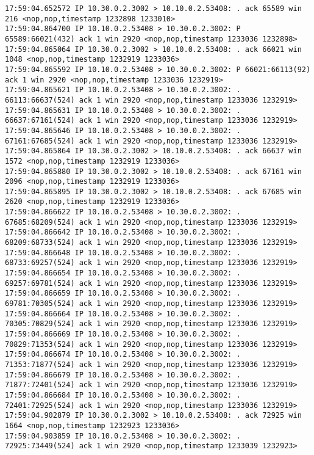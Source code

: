 \documentclass[a4paper,12pt]{article}
\begin{document}
\begin{Verbatim}
17:59:04.652572 IP 10.30.0.2.3002 > 10.10.0.2.53408: . ack 65589 win 216 <nop,nop,timestamp 1232898 1233010>
17:59:04.864700 IP 10.10.0.2.53408 > 10.30.0.2.3002: P 65589:66021(432) ack 1 win 2920 <nop,nop,timestamp 1233036 1232898>
17:59:04.865064 IP 10.30.0.2.3002 > 10.10.0.2.53408: . ack 66021 win 1048 <nop,nop,timestamp 1232919 1233036>
17:59:04.865592 IP 10.10.0.2.53408 > 10.30.0.2.3002: P 66021:66113(92) ack 1 win 2920 <nop,nop,timestamp 1233036 1232919>
17:59:04.865621 IP 10.10.0.2.53408 > 10.30.0.2.3002: . 66113:66637(524) ack 1 win 2920 <nop,nop,timestamp 1233036 1232919>
17:59:04.865631 IP 10.10.0.2.53408 > 10.30.0.2.3002: . 66637:67161(524) ack 1 win 2920 <nop,nop,timestamp 1233036 1232919>
17:59:04.865646 IP 10.10.0.2.53408 > 10.30.0.2.3002: . 67161:67685(524) ack 1 win 2920 <nop,nop,timestamp 1233036 1232919>
17:59:04.865864 IP 10.30.0.2.3002 > 10.10.0.2.53408: . ack 66637 win 1572 <nop,nop,timestamp 1232919 1233036>
17:59:04.865880 IP 10.30.0.2.3002 > 10.10.0.2.53408: . ack 67161 win 2096 <nop,nop,timestamp 1232919 1233036>
17:59:04.865895 IP 10.30.0.2.3002 > 10.10.0.2.53408: . ack 67685 win 2620 <nop,nop,timestamp 1232919 1233036>
17:59:04.866622 IP 10.10.0.2.53408 > 10.30.0.2.3002: . 67685:68209(524) ack 1 win 2920 <nop,nop,timestamp 1233036 1232919>
17:59:04.866642 IP 10.10.0.2.53408 > 10.30.0.2.3002: . 68209:68733(524) ack 1 win 2920 <nop,nop,timestamp 1233036 1232919>
17:59:04.866648 IP 10.10.0.2.53408 > 10.30.0.2.3002: . 68733:69257(524) ack 1 win 2920 <nop,nop,timestamp 1233036 1232919>
17:59:04.866654 IP 10.10.0.2.53408 > 10.30.0.2.3002: . 69257:69781(524) ack 1 win 2920 <nop,nop,timestamp 1233036 1232919>
17:59:04.866659 IP 10.10.0.2.53408 > 10.30.0.2.3002: . 69781:70305(524) ack 1 win 2920 <nop,nop,timestamp 1233036 1232919>
17:59:04.866664 IP 10.10.0.2.53408 > 10.30.0.2.3002: . 70305:70829(524) ack 1 win 2920 <nop,nop,timestamp 1233036 1232919>
17:59:04.866669 IP 10.10.0.2.53408 > 10.30.0.2.3002: . 70829:71353(524) ack 1 win 2920 <nop,nop,timestamp 1233036 1232919>
17:59:04.866674 IP 10.10.0.2.53408 > 10.30.0.2.3002: . 71353:71877(524) ack 1 win 2920 <nop,nop,timestamp 1233036 1232919>
17:59:04.866679 IP 10.10.0.2.53408 > 10.30.0.2.3002: . 71877:72401(524) ack 1 win 2920 <nop,nop,timestamp 1233036 1232919>
17:59:04.866684 IP 10.10.0.2.53408 > 10.30.0.2.3002: . 72401:72925(524) ack 1 win 2920 <nop,nop,timestamp 1233036 1232919>
17:59:04.902879 IP 10.30.0.2.3002 > 10.10.0.2.53408: . ack 72925 win 1664 <nop,nop,timestamp 1232923 1233036>
17:59:04.903859 IP 10.10.0.2.53408 > 10.30.0.2.3002: . 72925:73449(524) ack 1 win 2920 <nop,nop,timestamp 1233039 1232923>

\end{Verbatim}
\end{document}
